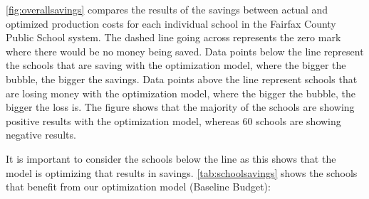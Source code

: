 \documentclass{scrartcl}
\begin{document}
\autoref{fig:overallsavings} compares the results of the savings between actual and optimized production costs for each individual school in the Fairfax County Public School system. The dashed line going across represents the zero mark where there would be no money being saved. Data points below the line represent the schools that are saving with the optimization model, where the bigger the bubble, the bigger the savings. Data points above the line represent schools that are losing money with the optimization model, where the bigger the bubble, the bigger the loss is. The figure shows that the majority of the schools are showing positive results with the optimization model, whereas 60 schools are showing negative results.

It is important to consider the schools below the line as this shows that the model is optimizing that results in savings. \autoref{tab:schoolsavings} shows the schools that benefit from our optimization model (Baseline Budget):

\setlength\LTleft{0pt}
\setlength\LTright{0pt}
\end{document}
